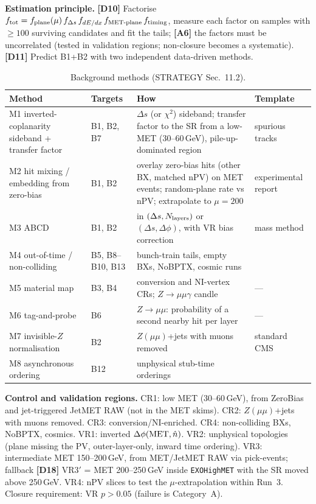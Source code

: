 \documentclass[11pt,a4paper]{article}
\newcommand{\lab}[1]{\textbf{[#1]}}
\begin{document}
\textbf{Estimation principle.} \lab{D10} Factorise $f_{\rm tot}=f_{\rm plane}(\mu)\,f_{\Delta s}\,f_{dE/dx}\,f_{\text{MET-plane}}\,f_{\rm timing}$, measure each factor on samples with $\geq100$ surviving candidates and fit the tails; \lab{A6} the factors must be uncorrelated (tested in validation regions; non-closure becomes a systematic). \lab{D11} Predict B1+B2 with two independent data-driven methods.

{\small
\begin{longtable}{@{}L{4.41cm}L{2.26cm}L{6.16cm}L{3.28cm}@{}}
\caption{Background methods (STRATEGY Sec.~11.2).}\label{tab:methods}\\
\toprule Method & Targets & How & Template\\\midrule\endfirsthead
\bottomrule\endfoot
M1 inverted-coplanarity sideband + transfer factor & B1, B2, B7 & $\Delta s$ (or $\chi^2$) sideband; transfer factor to the SR from a low-MET (30--60\,GeV), pile-up-dominated region & spurious tracks \cite{DT}\\
M2 hit mixing / embedding from zero-bias & B1, B2 & overlay zero-bias hits (other BX, matched nPV) on MET events; random-plane rate vs nPV; extrapolate to $\mu=200$ & experimental report\\
M3 ABCD & B1, B2 & in $(\Delta s, N_{\rm layers})$ or $(\Delta s,\Delta\phi)$, with VR bias correction & mass method \cite{HSCP}\\
M4 out-of-time / non-colliding & B5, B8--B10, B13 & bunch-train tails, empty BXs, NoBPTX, cosmic runs & \cite{stopped,L1DS}\\
M5 material map & B3, B4 & conversion and NI-vertex CRs; $Z\to\mu\mu\gamma$ candle & ---\\
M6 tag-and-probe & B6 & $Z\to\mu\mu$: probability of a second nearby hit per layer & ---\\
M7 invisible-$Z$ normalisation & B2 & $Z(\mu\mu)$+jets with muons removed & standard CMS\\
M8 asynchronous ordering & B12 & unphysical stub-time orderings & \cite{L1DS}\\
\end{longtable}
}

\textbf{Control and validation regions.} CR1: low MET (30--60\,GeV), from ZeroBias and jet-triggered JetMET RAW (not in the MET skims). CR2: $Z(\mu\mu)$+jets with muons removed. CR3: conversion/NI-enriched. CR4: non-colliding BXs, NoBPTX, cosmics. VR1: inverted $\Delta\phi({\rm MET},\hat n)$. VR2: unphysical topologies (plane missing the PV, outer-layer-only, inward time ordering). VR3: intermediate MET 150--200\,GeV, from MET/JetMET RAW via pick-events; fallback \lab{D18} VR3$'$ = MET 200--250\,GeV inside \texttt{EXOHighMET} with the SR moved above 250\,GeV. VR4: nPV slices to test the $\mu$-extrapolation within Run~3. Closure requirement: VR $p>0.05$ (failure is Category~A).
\end{document}
